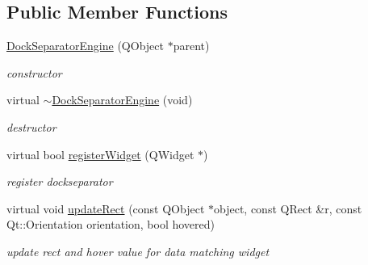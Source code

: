 \subsection*{Public Member Functions}
\begin{DoxyCompactItemize}
\item 
\mbox{\label{class_dock_separator_engine_af586681c5a1c0b84bf5c14b6677f9451}} 
\hyperlink{class_dock_separator_engine_af586681c5a1c0b84bf5c14b6677f9451}{Dock\+Separator\+Engine} (Q\+Object $\ast$parent)
\begin{DoxyCompactList}\small\item\em constructor \end{DoxyCompactList}\item 
\mbox{\label{class_dock_separator_engine_ac7ecada8328b03cbb261761d4f723bca}} 
virtual \hyperlink{class_dock_separator_engine_ac7ecada8328b03cbb261761d4f723bca}{$\sim$\+Dock\+Separator\+Engine} (void)
\begin{DoxyCompactList}\small\item\em destructor \end{DoxyCompactList}\item 
\mbox{\label{class_dock_separator_engine_a6a2711c5dba3e1e2501ebe57d9a426b0}} 
virtual bool \hyperlink{class_dock_separator_engine_a6a2711c5dba3e1e2501ebe57d9a426b0}{register\+Widget} (Q\+Widget $\ast$)
\begin{DoxyCompactList}\small\item\em register dockseparator \end{DoxyCompactList}\item 
\mbox{\label{class_dock_separator_engine_a460dd792ca88a6ebd9210c671aaa0bb4}} 
virtual void \hyperlink{class_dock_separator_engine_a460dd792ca88a6ebd9210c671aaa0bb4}{update\+Rect} (const Q\+Object $\ast$object, const Q\+Rect \&r, const Qt\+::\+Orientation orientation, bool hovered)
\begin{DoxyCompactList}\small\item\em update rect and hover value for data matching widget \end{DoxyCompactList}\item 
\mbox{\label{class_dock_separator_engine_a3ee05c4ef4f07122893a85bfc4d60443}} 

\end{DoxyCompactItemize}
